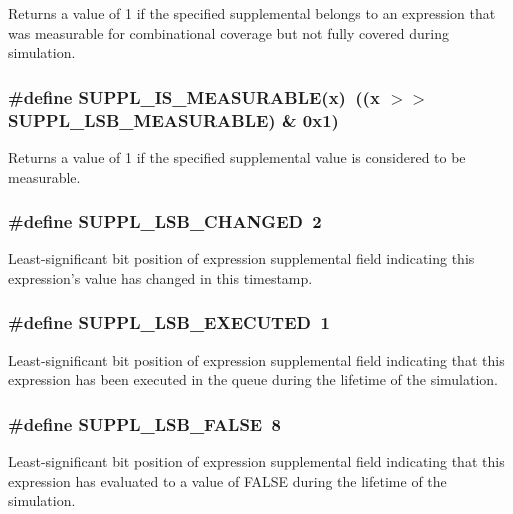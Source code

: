 Returns a value of 1 if the specified supplemental belongs to an expression that was measurable for combinational coverage but not fully covered during simulation. 
\subsubsection{\setlength{\rightskip}{0pt plus 5cm}\#define SUPPL\_\-IS\_\-MEASURABLE(x)\ ((x $>$$>$ SUPPL\_\-LSB\_\-MEASURABLE) \& 0x1)}\label{group__expr__suppl_a9}


Returns a value of 1 if the specified supplemental value is considered to be measurable. 
\subsubsection{\setlength{\rightskip}{0pt plus 5cm}\#define SUPPL\_\-LSB\_\-CHANGED\ 2}\label{group__expr__suppl_a2}


Least-significant bit position of expression supplemental field indicating this expression's value has changed in this timestamp. 
\subsubsection{\setlength{\rightskip}{0pt plus 5cm}\#define SUPPL\_\-LSB\_\-EXECUTED\ 1}\label{group__expr__suppl_a1}


Least-significant bit position of expression supplemental field indicating that this expression has been executed in the queue during the lifetime of the simulation. 
\subsubsection{\setlength{\rightskip}{0pt plus 5cm}\#define SUPPL\_\-LSB\_\-FALSE\ 8}\label{group__expr__suppl_a4}


Least-significant bit position of expression supplemental field indicating that this expression has evaluated to a value of FALSE during the lifetime of the simulation. 
